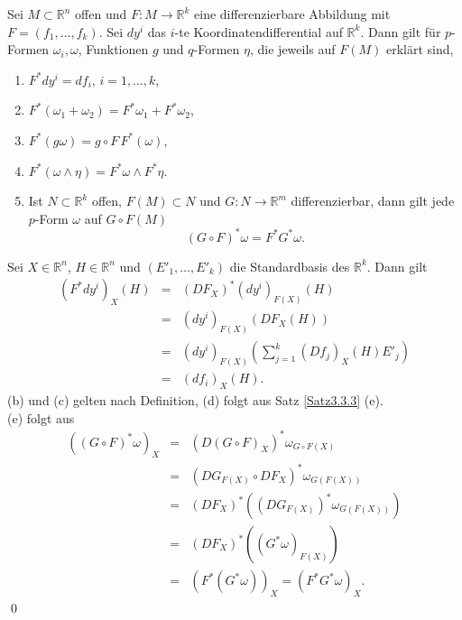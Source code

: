 \documentclass[a4paper,twoside,DIV15,BCOR12mm]{scrbook}
\begin{document}
\begin{satz}\label{Satz3.4.1} {Sei $M \subset {\mathbb R}^{n}$ offen und 
$F: M \to {\mathbb R}^{k}$ eine differenzierbare Abbildung mit 
$F = (f_{1},\dots,f_{k})$. Sei $dy^{i}$ das $i$-te Koordinatendifferential auf 
${\mathbb R}^{k}$. Dann gilt für $p$-Formen $\omega_{i},\omega$, Funktionen $g$ 
und $q$-Formen $\eta$, die jeweils  auf $F(M)$ erklärt sind,}
\begin{enumerate}
\item[{\rm (a)}] $F^{*}dy^{i} = df_{i}$, \qquad $i = 1,\dots,k$,
\item[{\rm (b)}] $F^{*}(\omega_{1} + \omega_{2}) = F^{*}\omega_{1} + F^{*}\omega_{2}$,
\item[{\rm (c)}] $F^{*}(g\omega) = g \circ F\, F^{*}(\omega)$, 
\item[{\rm (d)}] $F^{*}(\omega \wedge \eta) = F^{*}\omega \wedge F^{*}\eta$.
\item[{\rm (e)}] {Ist $N \subset {\mathbb R}^{k}$ offen, $F(M) \subset N$ und $G: N \to {\mathbb R}^{m}$ differenzierbar, dann gilt jede $p$-Form $\omega$ auf $G \circ F(M)$}
\[ (G \circ F)^{*}\omega = F^{*} G^{*}\omega. \]
\end{enumerate}
\end{satz}

 Sei $X \in {\mathbb R}^{n}$, $H \in {\mathbb R}^{n}$ und $(E'_{1},\dots,E'_{k})$ die Standardbasis des ${\mathbb R}^{k}$. Dann gilt
\begin{eqnarray*}
 (F^{*}dy^{i})_{X}(H) &=& (DF_{X})^{*}(dy^{i})_{F(X)}(H)\\
& = & (dy^{i})_{F(X)}(DF_{X}(H)) \\
& = & (dy^{i})_{F(X)}\left(\sum_{j=1}^{k}(Df_{j})_{X}(H)E'_{j}\right) \\
& = & (df_{i})_{X}(H).
\end{eqnarray*}
(b) und (c) gelten nach Definition, (d) folgt aus Satz \ref{Satz3.3.3} (e).\\

\noindent
(e) folgt aus
\begin{eqnarray*}
((G \circ F)^{*}\omega)_{X} & = & (D(G \circ F)_{X})^{*} \omega_{G \circ F(X)} \\
& = & (DG_{F(X)} \circ DF_{X})^{*} \omega_{G(F(X))} \\
& = & (DF_{X})^{*}\left((DG_{F(X)})^{*} \omega_{G(F(X))}\right) \\
& = & (DF_{X})^{*}\left((G^{*}\omega)_{F(X)}\right) \\
& = & \left(F^{*}(G^{*}\omega)\right)_{X} = (F^{*}G^{*}\omega)_{X}.
\end{eqnarray*}
\qed\\
\end{document}
